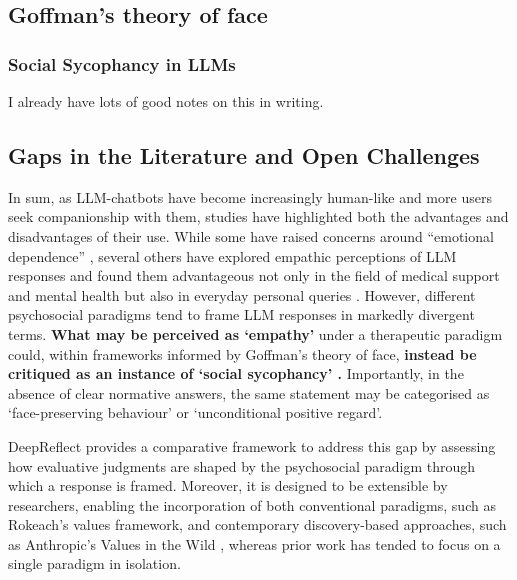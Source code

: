 
\subsection{Goffman's theory of face}
\textcolor{black!30}{\lipsum[9-10]}
\subsubsection{Social Sycophancy in LLMs}

\textcolor{black!30}{\lipsum[12-14]}
\textcolor{black!30}{I already have lots of good notes on this in writing.}


\subsection{Gaps in the Literature and Open Challenges}
In sum, as LLM-chatbots have become increasingly human-like and more users seek companionship with them, studies have highlighted both the advantages and disadvantages of their use. While some have raised concerns around “emotional dependence” \cite{fang-etal-psychoeffects}, several others have explored empathic perceptions of LLM responses and found them advantageous not only in the field of medical support and mental health but also in everyday personal queries \cite{Lee-etal-Empathic}.
However, different psychosocial paradigms tend to frame LLM responses in markedly divergent terms. \textbf{What may be perceived as ‘empathy’} under a therapeutic paradigm could, within frameworks informed by Goffman’s theory of face, \textbf{instead be critiqued as an instance of ‘social sycophancy’ \cite{cheng-etal-sycophancy}.} 
Importantly, in the absence of clear normative answers, the same statement may be categorised as ‘face-preserving behaviour’ or ‘unconditional positive regard’. 

\medskip DeepReflect provides a comparative framework to address this gap by assessing how evaluative judgments are shaped by the psychosocial paradigm through which a response is framed. 
Moreover, it is designed to be extensible by researchers, enabling the incorporation of both conventional paradigms, such as Rokeach’s values framework, and contemporary discovery-based approaches, such as Anthropic’s Values in the Wild \cite{values-in-wild}, whereas prior work has tended to focus on a single paradigm in isolation.

